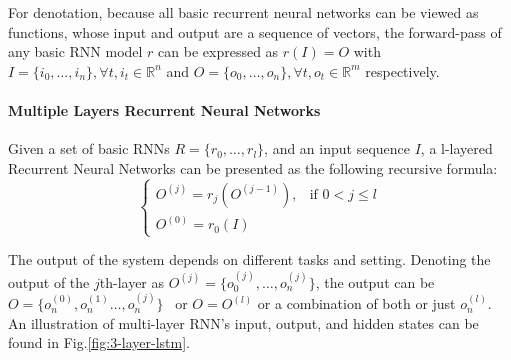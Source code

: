 For denotation, because all basic recurrent neural networks can be viewed as functions, whose input and output are a sequence of vectors, the forward-pass of any basic RNN model \(r\) can be expressed as \(r(I) = O\) with \(I = \{i_0,\ldots,i_n\}, \forall t, i_t \in \mathbb{R}^n\) and \(O = \{o_0,\ldots,o_n\}, \forall t, o_t \in \mathbb{R}^m\) respectively. 

\paragraph{Multiple Layers Recurrent Neural Networks}\label{sec:multilayer-lstm}
Given a set of basic RNNs \(R = \{r_0,\ldots,r_l\}\), and an input sequence \(I\), a l-layered Recurrent Neural Networks can be presented as the following recursive formula:
\begin{equation}
    \begin{cases}
    O^{(j)} = r_j(O^{(j-1)}), & \mbox{if }  0 < j \leq l\\
    O^{(0)} = r_0(I) 
    \end{cases}
\end{equation}

The output of the system depends on different tasks and setting. 
Denoting the output of the \(j\)th-layer as  \(O^{(j)} = \{o^{(j)}_0,\ldots,o^{(j)}_n\}\), the output can be \(O= \{o^{(0)}_n, o^{(1)}_n\ldots,o^{(j)}_n\}\)~\cite{treeLSTM} or \(O = O^{(l)}\) or a combination of both or just \(o^{(l)}_n\). 
An illustration of multi-layer RNN's input, output, and hidden states can be found in Fig.\ref{fig:3-layer-lstm}.

